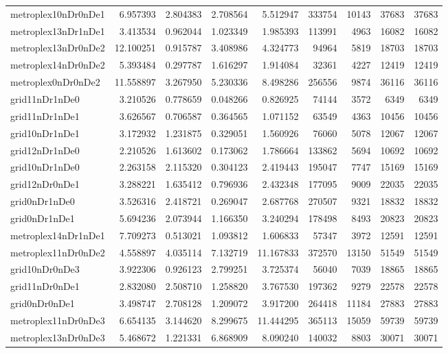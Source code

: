 \begin{longtable}{|l|r|r|r|r|r|r|r|r|}
metroplex10nDr0nDe1 & 6.957393 & 2.804383 & 2.708564 & 5.512947 & 333754 & 10143 & 37683 & 37683 \\
metroplex13nDr1nDe1 & 3.413534 & 0.962044 & 1.023349 & 1.985393 & 113991 & 4963 & 16082 & 16082 \\
metroplex13nDr0nDe2 & 12.100251 & 0.915787 & 3.408986 & 4.324773 & 94964 & 5819 & 18703 & 18703 \\
metroplex14nDr0nDe2 & 5.393484 & 0.297787 & 1.616297 & 1.914084 & 32361 & 4227 & 12419 & 12419 \\
metroplex0nDr0nDe2 & 11.558897 & 3.267950 & 5.230336 & 8.498286 & 256556 & 9874 & 36116 & 36116 \\
grid11nDr1nDe0 & 3.210526 & 0.778659 & 0.048266 & 0.826925 & 74144 & 3572 & 6349 & 6349 \\
grid11nDr1nDe1 & 3.626567 & 0.706587 & 0.364565 & 1.071152 & 63549 & 4363 & 10456 & 10456 \\
grid10nDr1nDe1 & 3.172932 & 1.231875 & 0.329051 & 1.560926 & 76060 & 5078 & 12067 & 12067 \\
grid12nDr1nDe0 & 2.210526 & 1.613602 & 0.173062 & 1.786664 & 133862 & 5694 & 10692 & 10692 \\
grid10nDr1nDe0 & 2.263158 & 2.115320 & 0.304123 & 2.419443 & 195047 & 7747 & 15169 & 15169 \\
grid12nDr0nDe1 & 3.288221 & 1.635412 & 0.796936 & 2.432348 & 177095 & 9009 & 22035 & 22035 \\
grid0nDr1nDe0 & 3.526316 & 2.418721 & 0.269047 & 2.687768 & 270507 & 9321 & 18832 & 18832 \\
grid0nDr1nDe1 & 5.694236 & 2.073944 & 1.166350 & 3.240294 & 178498 & 8493 & 20823 & 20823 \\
metroplex14nDr1nDe1 & 7.709273 & 0.513021 & 1.093812 & 1.606833 & 57347 & 3972 & 12591 & 12591 \\
metroplex11nDr0nDe2 & 4.558897 & 4.035114 & 7.132719 & 11.167833 & 372570 & 13150 & 51549 & 51549 \\
grid10nDr0nDe3 & 3.922306 & 0.926123 & 2.799251 & 3.725374 & 56040 & 7039 & 18865 & 18865 \\
grid11nDr0nDe1 & 2.832080 & 2.508710 & 1.258820 & 3.767530 & 197362 & 9279 & 22578 & 22578 \\
grid0nDr0nDe1 & 3.498747 & 2.708128 & 1.209072 & 3.917200 & 264418 & 11184 & 27883 & 27883 \\
metroplex11nDr0nDe3 & 6.654135 & 3.144620 & 8.299675 & 11.444295 & 365113 & 15059 & 59739 & 59739 \\
metroplex13nDr0nDe3 & 5.468672 & 1.221331 & 6.868909 & 8.090240 & 140032 & 8803 & 30071 & 30071 \\

\end{longtable}
